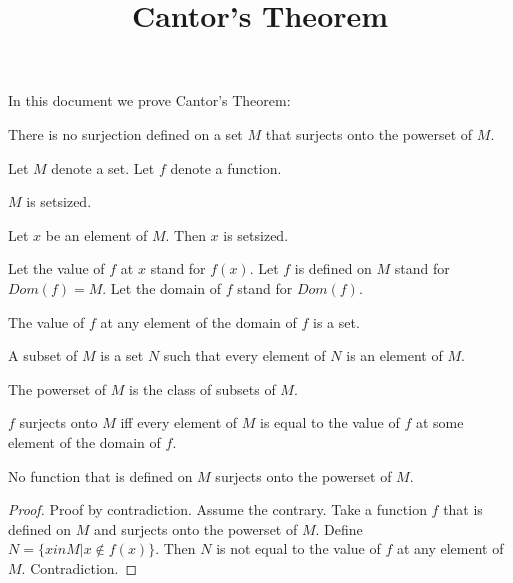 \documentclass{document}
\title{Cantor's Theorem}
\author{}
\date{}
\begin{document}

  \maketitle

  In this document we prove Cantor's Theorem:

  \begin{theorem}
    There is no surjection defined on a set $M$ that surjects onto the powerset of $M$.
  \end{theorem}

  \begin{forthel}

    Let $M$ denote a set. Let $f$ denote a function.

    \begin{axiom}
        $M$ is setsized.
    \end{axiom}

    \begin{axiom}
        Let $x$ be an element of $M$. Then $x$ is setsized.
    \end{axiom}

    Let the value of $f$ at $x$ stand for $f(x)$. Let $f$ is defined on $M$ stand for $Dom(f) = M$. Let the domain of $f$ stand for $Dom(f)$.


    \begin{axiom}
      The value of $f$ at any element of the domain of $f$ is a set.
    \end{axiom}

    \begin{definition}[subset]
      A subset of $M$ is a set $N$ such that every element of $N$ is an element of $M$.
    \end{definition}

    \begin{definition}
      The powerset of $M$ is the class of subsets of $M$.
    \end{definition}

    \begin{definition}
      $f$ surjects onto $M$ iff every element of $M$ is equal to the value of $f$ at some element of the domain of $f$.
    \end{definition}

    \begin{proposition}
      No function that is defined on $M$ surjects onto the powerset of $M$.
    \end{proposition}
    \begin{proof}
      Proof by contradiction. Assume the contrary. Take a function $f$ that is defined on $M$ and surjects onto the powerset of $M$. Define $N = \{ x in M | x \notin f(x) \}$. Then $N$ is not equal to the value of $f$ at any element of $M$. Contradiction.
    \end{proof}

  \end{forthel}
\end{document}
